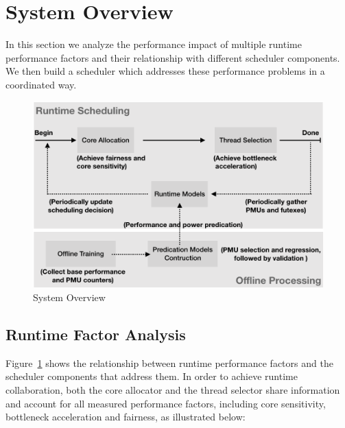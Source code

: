 \section{System Overview}
In this section we analyze the performance impact of multiple runtime performance factors and their relationship with different scheduler components. We then build a scheduler which addresses these performance problems in a coordinated way.

\begin{figure}
\centering
\includegraphics[scale=0.5]{figures/overview.png}
\caption{System Overview}
\label{figure:f1}
\end{figure} 

\subsection{Runtime Factor Analysis}
Figure~\ref{figure:f1} shows the relationship between runtime performance factors and the scheduler components that address them. In order to achieve runtime collaboration, both the core allocator and the thread selector share information and account for all measured performance factors, including core sensitivity, bottleneck acceleration and fairness,%
 as illustrated below:

